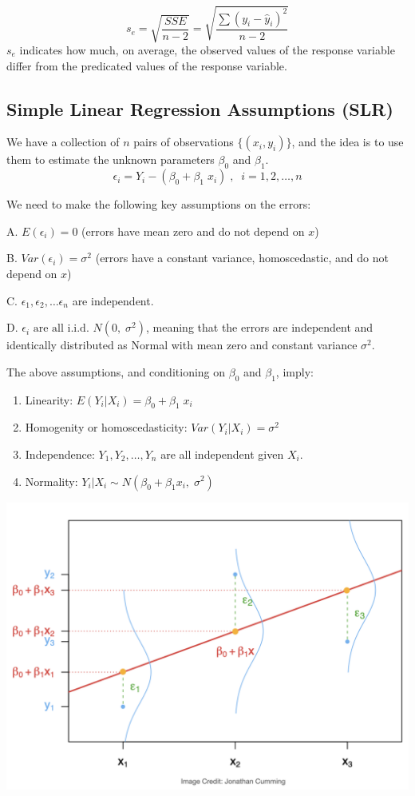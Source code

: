 \documentclass[
]{article}
\begin{document}
\[s_e=\sqrt{\frac{SSE}{n-2}}=\sqrt{\frac{\sum(y_i-\hat{y}_i)^2}{n-2}} \]
\(s_e\) indicates how much, on average, the observed values of the
response variable differ from the predicated values of the response
variable. \(~\)

\hypertarget{simple-linear-regression-assumptions-slr}{%
\subsection{Simple Linear Regression Assumptions
(SLR)}\label{simple-linear-regression-assumptions-slr}}

We have a collection of \(n\) pairs of observations \(\{(x_i,y_i)\}\),
and the idea is to use them to estimate the unknown parameters
\(\beta_0\) and \(\beta_1\).
\[\epsilon_i=Y_i-(\beta_0+\beta_1\;x_i)\;,\;\;i=1,2,\ldots,n\]

We need to make the following key assumptions on the errors:

A. \(E(\epsilon_i)=0\) (errors have mean zero and do not depend on
\(x\))

B. \(Var(\epsilon_i)=\sigma^2\) (errors have a constant variance,
homoscedastic, and do not depend on \(x\))

C. \(\epsilon_1, \epsilon_2,\ldots \epsilon_n\) are independent.

D. \(\epsilon_i \mbox{ are all i.i.d. } N(0, \;\sigma^2)\), meaning that
the errors are independent and identically distributed as Normal with
mean zero and constant variance \(\sigma^2\).

The above assumptions, and conditioning on \(\beta_0\) and \(\beta_1\),
imply:

\begin{enumerate}
\def\labelenumi{\alph{enumi}.}
\item
  Linearity: \(E(Y_i|X_i)=\beta_0+\beta_1\;x_i\)
\item
  Homogenity or homoscedasticity: \(Var(Y_i|X_i)=\sigma^2\)
\item
  Independence: \(Y_1,Y_2,\ldots,Y_n\) are all independent given
  \(X_i\).
\item
  Normality: \(Y_i|X_i\sim N(\beta_0+\beta_1x_i,\;\sigma^2)\)
\end{enumerate}

\begin{center}\includegraphics[width=0.6\linewidth,height=0.6\textheight]{figures/ass1} \end{center}
\end{document}
